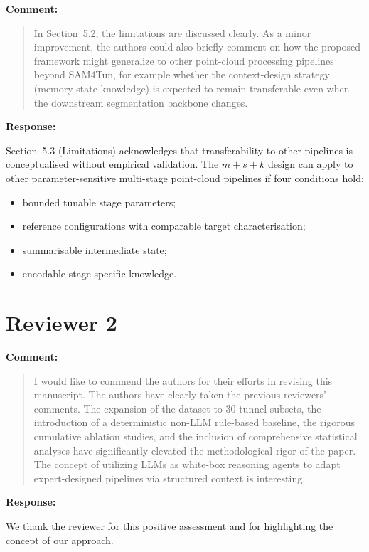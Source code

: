 \documentclass[11pt,a4paper]{article}
\newenvironment{commentblock}{%
  \par\smallskip\noindent\textbf{Comment:}\par
  \begin{quote}\itshape\color{black}
}{%
  \end{quote}\smallskip
}
\newenvironment{responseblock}{%
  \par\smallskip\noindent\textbf{Response:}\par
  \begingroup\color{responsegreen}
}{%
  \endgroup\smallskip
}
\begin{document}
\begin{commentblock}
In Section~5.2, the limitations are discussed clearly. As a minor improvement, the authors could also briefly comment on how the proposed framework might generalize to other point-cloud processing pipelines beyond SAM4Tun, for example whether the context-design strategy (memory-state-knowledge) is expected to remain transferable even when the downstream segmentation backbone changes.
\end{commentblock}
\begin{responseblock}
Section~5.3 (Limitations) acknowledges that transferability to other pipelines is conceptualised without empirical validation. The $m+s+k$ design can apply to other parameter-sensitive multi-stage point-cloud pipelines if four conditions hold:
\begin{itemize}[nosep]
  \item bounded tunable stage parameters;
  \item reference configurations with comparable target characterisation;
  \item summarisable intermediate state;
  \item encodable stage-specific knowledge.
\end{itemize}
\end{responseblock}

\section*{Reviewer 2}

\begin{commentblock}
I would like to commend the authors for their efforts in revising this manuscript. The authors have clearly taken the previous reviewers' comments. The expansion of the dataset to 30 tunnel subsets, the introduction of a deterministic non-LLM rule-based baseline, the rigorous cumulative ablation studies, and the inclusion of comprehensive statistical analyses have significantly elevated the methodological rigor of the paper. The concept of utilizing LLMs as white-box reasoning agents to adapt expert-designed pipelines via structured context is interesting.
\end{commentblock}
\begin{responseblock}
We thank the reviewer for this positive assessment and for highlighting the concept of our approach.
\end{responseblock}
\end{document}
